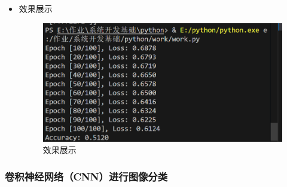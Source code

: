\documentclass[UTF8]{ctexart}
\begin{document}
\begin{enumerate}
\begin{itemize}
\item 效果展示
  \begin{figure}[H]
    \centering
    \includegraphics[width=\textwidth]{335} %
    \caption{效果展示}
  \end{figure}
  \end{itemize}
\end{enumerate}





















\subsubsection{卷积神经网络（CNN）进行图像分类}
\end{document}
